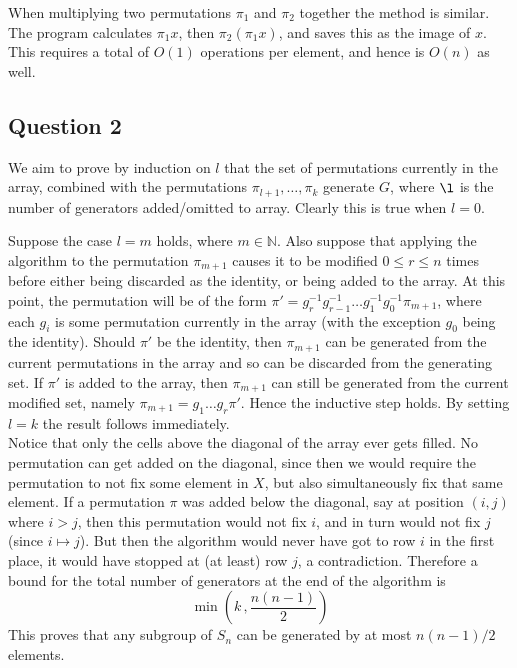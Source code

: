 \documentclass[10pt,a4paper,notitlepage]{article}
\newcommand{\N}{\mathbb{N}}
\begin{document}
When multiplying two permutations $\pi_{1}$ and $\pi_{2}$ together the method is similar. The program calculates $\pi_{1}x$, then $\pi_{2}(\pi_{1}x)$, and saves this as the image of $x$. This requires a total of $O(1)$ operations per element, and hence is $O(n)$ as well.

\subsection*{\centering Question 2}
We aim to prove by induction on $l$ that the set of permutations currently in the array, combined with the permutations $\pi_{l+1},\hdots,\pi_{k}$ generate $G$, where $\l$ is the number of generators added/omitted to array. Clearly this is true when $l=0$.

Suppose the case $l=m$ holds, where $m\in \N$. Also suppose that applying the algorithm to the permutation $\pi_{m+1}$ causes it to be modified $0\leq r\leq n$ times before either being discarded as the identity, or being added to the array. At this point, the permutation will be of the form $\pi'=g_{r}^{-1}g_{r-1}^{-1}\hdots g_{1}^{-1}g_{0}^{-1}\pi_{m+1}$, where each $g_{i}$ is some permutation currently in the array (with the exception $g_{0}$ being the identity). Should $\pi'$ be the identity, then $\pi_{m+1}$ can be generated from the current permutations in the array and so can be discarded from the generating set. If $\pi'$ is added to the array, then $\pi_{m+1}$ can still be generated from the current modified set, namely $\pi_{m+1}=g_{1}\hdots g_{r}\pi'$. Hence the inductive step holds. By setting $l=k$ the result follows immediately.\\

Notice that only the cells above the diagonal of the array ever gets filled. No permutation can get added on the diagonal, since then we would require the permutation to not fix some element in $X$, but also simultaneously fix that same element. If a permutation $\pi$ was added below the diagonal, say at position $(i,j)$ where $i>j$, then this permutation would not fix $i$, and in turn would not fix $j$ (since $i\mapsto j$). But then the algorithm would never have got to row $i$ in the first place, it would have stopped at (at least) row $j$, a contradiction. Therefore a bound for the total number of generators at the end of the algorithm is
\begin{equation}\label{eq:bound}
\min\left( k \, , \frac{n(n-1)}{2}\right)
\end{equation}
This proves that any subgroup of $S_{n}$ can be generated by at most $n(n-1)/2$ elements.\\
\end{document}
